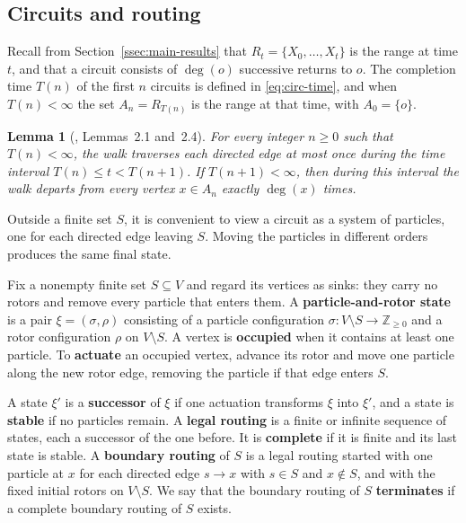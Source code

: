 \documentclass[11pt]{amsart}
\theoremstyle{plain}
\newtheorem{lemma}[theorem]{Lemma}
\theoremstyle{definition}
\newcommand{\Z}{\mathbb Z}
\newcommand{\defn}[1]{\textbf{#1}}
\begin{document}
	\subsection{Circuits and routing}
	
	Recall from Section~\ref{ssec:main-results} that $R_t=\{X_0,\ldots,X_t\}$ is
	the range at time $t$, and that a circuit consists of $\deg(o)$ successive
	returns to $o$.  The completion time $T(n)$ of the first $n$ circuits is
	defined in \eqref{eq:circ-time}, and when $T(n)<\infty$ the set $A_n=R_{T(n)}$
	is the range at that time, with $A_0=\{o\}$.
	
	\begin{lemma}[\citealp{FlorescuLevinePeres2016}, Lemmas~2.1
		and~2.4]\label{lem:one-circuit}
		For every integer $n\geq0$ such that $T(n)<\infty$, the walk traverses each
		directed edge at most once during the time interval
		$T(n)\leq t<T(n+1)$.  If $T(n+1)<\infty$, then during this interval the
		walk departs from every vertex $x\in A_n$ exactly $\deg(x)$ times.
	\end{lemma}
	
	
	Outside a finite set $S$, it is convenient to view a circuit as a system of
	particles, one for each directed edge leaving $S$.  Moving the particles in
	different orders produces the same final state.
	
	Fix a nonempty finite set $S\subseteq V$ and regard its vertices as sinks:
	they carry no rotors and remove every particle that enters them.
	A \defn{particle-and-rotor state} is a pair $\xi=(\sigma,\rho)$ consisting of
	a particle configuration $\sigma:V\setminus S\to\Z_{\geq0}$ and a rotor
	configuration $\rho$ on $V\setminus S$.  A vertex is \defn{occupied} when it
	contains at least one particle.  To \defn{actuate} an occupied vertex, advance
	its rotor and move one particle along the new rotor edge, removing the
	particle if that edge enters $S$.
	
	A state $\xi'$ is a \defn{successor} of $\xi$ if one actuation transforms
	$\xi$ into $\xi'$, and a state is \defn{stable} if no particles remain.  A
	\defn{legal routing} is a finite or infinite sequence of states, each a
	successor of the one before.  It is \defn{complete} if it is finite and its
	last state is stable.  A \defn{boundary routing} of $S$ is a legal routing
	started with one particle at $x$ for each directed edge $s\to x$ with
	$s\in S$ and $x\notin S$, and with the fixed initial rotors on
	$V\setminus S$.  We say that the boundary routing of $S$ \defn{terminates} if
	a complete boundary routing of $S$ exists.
	
\end{document}
